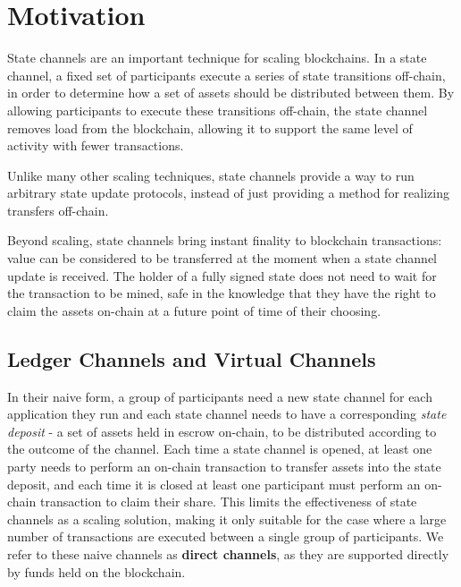 \section{Motivation}

State channels are an important technique for scaling blockchains.
In a state channel, a fixed set of participants execute a series of state transitions off-chain, in order to determine how a set of assets should be distributed between them.
By allowing participants to execute these transitions off-chain, the state channel removes load from the blockchain, allowing it to support the same level of activity with fewer transactions.

Unlike many other scaling techniques, state channels provide a way to run arbitrary state update protocols, instead of just providing a method for realizing transfers off-chain.

Beyond scaling, state channels bring instant finality to blockchain transactions:
value can be considered to be transferred at the moment when a state channel update is received.
The holder of a fully signed state does not need to wait for the transaction to be mined, safe in the knowledge
that they have the right to claim the assets on-chain at a future point of time of their choosing.

\subsection{Ledger Channels and Virtual Channels}

In their naive form, a group of participants need a new state channel for each application they run and each state channel needs to have a corresponding \textit{state deposit} - a set of assets held in escrow on-chain, to be distributed according to the outcome of the channel.
Each time a state channel is opened, at least one party needs to perform an on-chain transaction to transfer assets into the state deposit, and each time it is closed at least one participant must perform an on-chain transaction to claim their share.
This limits the effectiveness of state channels as a scaling solution, making it only suitable for the case where a large number of transactions are executed between a single group of participants.
We refer to these naive channels as \textbf{direct channels}, as they are supported directly by funds held on the blockchain.


